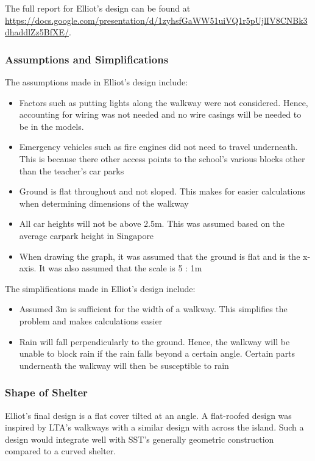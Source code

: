 \documentclass[a4paper,titlepage]{article}
\begin{document}
The full report for Elliot's design can be found at \url{https://docs.google.com/presentation/d/1zyhsfGaWW51uiVQ1r5pUjlIV8CNBk3dhaddlZz5BfXE/}.

\subsubsection{Assumptions and Simplifications}

The assumptions made in Elliot's design include:

\begin{itemize}
    \item Factors such as putting lights along the walkway were not considered. Hence, accounting for wiring was not needed and no wire casings will be needed to be in the models.
    \item Emergency vehicles such as fire engines did not need to travel underneath. This is because there other access points to the school’s various blocks other than the teacher’s car parks
    \item Ground is flat throughout and not sloped. This makes for easier calculations when determining dimensions of the walkway
    \item All car heights will not be above 2.5m. This was assumed based on the average carpark height in Singapore
    \item When drawing the graph, it was assumed that the ground is flat and is the x-axis. It was also assumed that the scale is 5 : 1m
\end{itemize}

The simplifications made in Elliot's design include:

\begin{itemize}
    \item Assumed 3m is sufficient for the width of a walkway. This simplifies the problem and makes calculations easier
    \item Rain will fall perpendicularly to the ground. Hence, the walkway will be unable to block rain if the rain falls beyond a certain angle. Certain parts underneath the walkway will then be susceptible to rain
\end{itemize}

\subsubsection{Shape of Shelter}

Elliot's final design is a flat cover tilted at an angle. A flat-roofed design was inspired by LTA's walkways with a similar design with across the island. Such a design would integrate well with SST's generally geometric construction compared to a curved shelter. 
\end{document}

